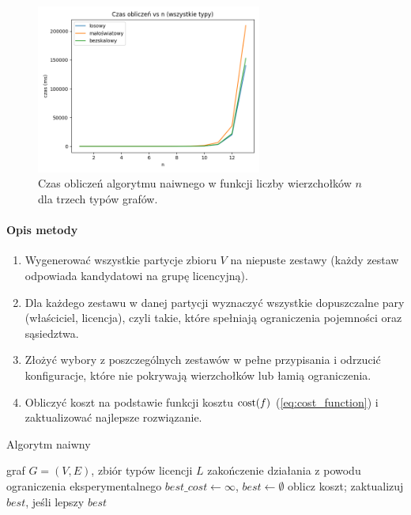 \begin{figure}[H]
  \centering
  \includegraphics[width=0.66\textwidth]{assets/all_types_plot.png}
  \caption{Czas obliczeń algorytmu naiwnego w funkcji liczby wierzchołków $n$ dla trzech typów grafów.}
  \label{fig:all_types_time}
\end{figure}

\paragraph{Opis metody}
\begin{enumerate}
  \item Wygenerować wszystkie partycje zbioru \(V\) na niepuste zestawy (każdy zestaw odpowiada kandydatowi na grupę licencyjną).
  \item Dla każdego zestawu w danej partycji wyznaczyć wszystkie dopuszczalne pary (właściciel, licencja), czyli takie, które spełniają ograniczenia pojemności oraz sąsiedztwa.
  \item Złożyć wybory z poszczególnych zestawów w pełne przypisania i odrzucić konfiguracje, które nie pokrywają wierzchołków lub łamią ograniczenia.
  \item Obliczyć koszt na podstawie funkcji kosztu $\operatorname{cost}(f)$ (\ref{eq:cost_function}) i zaktualizować najlepsze rozwiązanie.
\end{enumerate}

\begin{algorithm}[H]
  \caption{Algorytm naiwny}
  \label{alg:naive}
  \begin{algorithmic}[1]
    \Require graf \(G=(V,E)\), zbiór typów licencji \(L\)
     \State \Return zakończenie działania z powodu ograniczenia eksperymentalnego \EndIf
    \State \(best\_cost \gets \infty\), \(best \gets \emptyset\)
    \State oblicz koszt; zaktualizuj \(best\), jeśli lepszy
    \EndIf
    \EndFor
    \EndFor
    \State \Return \(best\)
  \end{algorithmic}
\end{algorithm}

